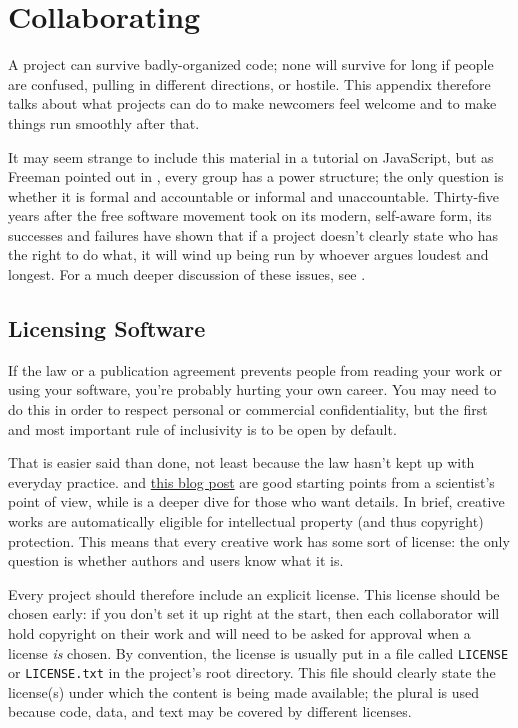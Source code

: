 \chapter{Collaborating}\label{s:collab}

A project can survive badly-organized code;
none will survive for long if people are confused,
pulling in different directions,
or hostile.
This appendix therefore talks about what projects can do to make newcomers feel welcome
and to make things run smoothly after that.

It may seem strange to include this material in a tutorial on JavaScript,
but as Freeman pointed out in \cite{Free1972},
every group has a power structure;
the only question is whether it is formal and accountable
or informal and unaccountable.
Thirty-five years after the free software movement took on its modern, self-aware form,
its successes and failures have shown that if a project doesn't clearly state
who has the right to do what,
it will wind up being run by whoever argues loudest and longest.
For a much deeper discussion of these issues,
see \cite{Foge2005}.

\section{Licensing Software}\label{s:collab-software}

If the law or a publication agreement prevents people from reading your work or using your software,
you're probably hurting your own career.
You may need to do this in order to respect personal or commercial confidentiality,
but the first and most important rule of inclusivity
is to be open by default.

That is easier said than done,
not least because the law hasn't kept up with everyday practice.
\cite{Mori2012} and \href{http://www.astrobetter.com/blog/2014/03/10/the-whys-and-hows-of-licensing-scientific-code/}{this blog post}
are good starting points from a scientist's point of view,
while \cite{Lind2008} is a deeper dive for those who want details.
In brief,
creative works are automatically eligible for intellectual property (and thus copyright) protection.
This means that every creative work has some sort of license:
the only question is whether authors and users know what it is.

Every project should therefore include an explicit license.
This license should be chosen early:
if you don't set it up right at the start,
then each collaborator will hold copyright on their work
and will need to be asked for approval when a license \emph{is} chosen.
By convention,
the license is usually put in a file called \texttt{LICENSE} or \texttt{LICENSE.txt} in the project's root directory.
This file should clearly state the license(s) under which the content is being made available;
the plural is used because code, data, and text may be covered by different licenses.

